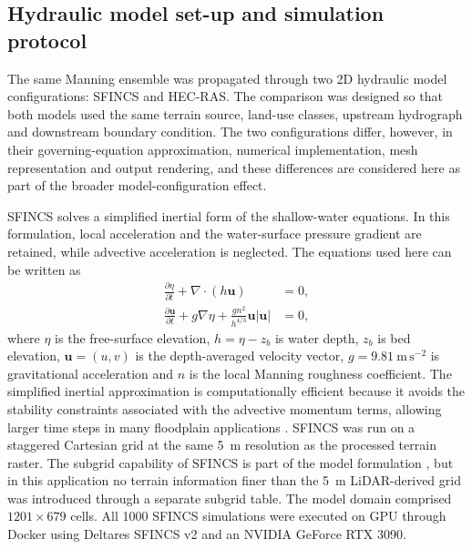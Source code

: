 \documentclass[a4paper,fleqn]{cas-sc}
\newcommand{\nman}{$n$}
\newcommand{\sfincs}{\textsc{SFINCS}}
\newcommand{\hecras}{\textsc{HEC-RAS}}
\begin{document}
\subsection{Hydraulic model set-up and simulation protocol}\label{sec:model_setup}
The same Manning ensemble was propagated through two 2D hydraulic model configurations: \sfincs{} and \hecras{}. The comparison was designed so that both models used the same terrain source, land-use classes, upstream hydrograph and downstream boundary condition. The two configurations differ, however, in their governing-equation approximation, numerical implementation, mesh representation and output rendering, and these differences are considered here as part of the broader model-configuration effect.

\sfincs{} \citep{deltares2023sfincs,vanormondt2025sfincs} solves a simplified inertial form of the shallow-water equations. In this formulation, local acceleration and the water-surface pressure gradient are retained, while advective acceleration is neglected. The equations used here can be written as 
\begin{align}
\frac{\partial \eta}{\partial t} + \nabla\cdot(h\mathbf{u}) &= 0 ,
\label{eq:sfincs_cont}\\
\frac{\partial \mathbf{u}}{\partial t} + g\nabla\eta +
\frac{g n^2}{h^{4/3}}\mathbf{u}|\mathbf{u}| &= 0 ,
\label{eq:sfincs_mom}
\end{align}
where $\eta$ is the free-surface elevation, $h = \eta - z_b$ is water depth, $z_b$ is bed elevation, $\mathbf{u}=(u,v)$ is the depth-averaged velocity vector, $g=9.81~\mathrm{m\,s^{-2}}$ is gravitational acceleration and \nman{} is the local Manning roughness coefficient. The simplified inertial approximation is computationally efficient because it avoids the stability constraints associated with the advective momentum terms, allowing larger time steps in many floodplain applications \citep{bates2010}. \sfincs{} was run on a staggered Cartesian grid at the same 5~m resolution as the processed terrain raster. The subgrid capability of \sfincs{} is part of the model formulation \citep{vanormondt2025sfincs}, but in this application no terrain information finer than the 5~m LiDAR-derived grid was introduced through a separate subgrid table. The model domain comprised $1201 \times 679$ cells. All \num{1000} \sfincs{} simulations were executed on GPU
through Docker using Deltares SFINCS v2 and an NVIDIA GeForce RTX 3090.
\end{document}
